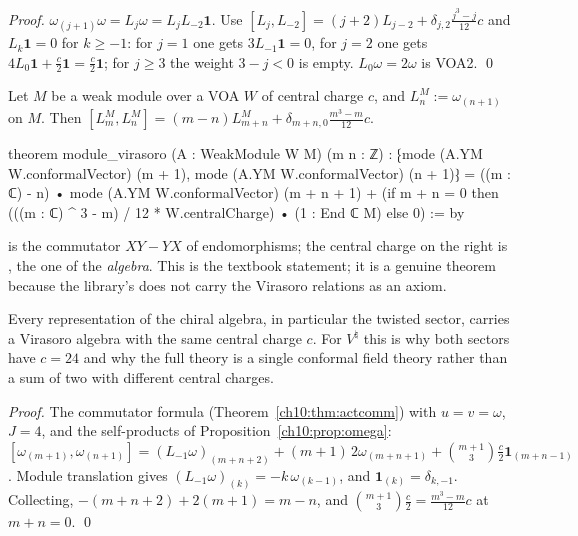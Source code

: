 \emph{Proof.} $\omega_{(j+1)}\omega=L_j\omega=L_jL_{-2}\mathbf1$.  Use $[L_j,L_{-2}]=(j+2)L_{j-2}+
\delta_{j,2}\frac{j^3-j}{12}c$ and $L_k\mathbf1=0$ for $k\ge-1$: for $j=1$ one gets
$3L_{-1}\mathbf1=0$, for $j=2$ one gets $4L_0\mathbf1+\frac c2\mathbf1=\frac c2\mathbf1$; for
$j\ge3$ the weight $3-j<0$ is empty.  $L_0\omega=2\omega$ is VOA2. \qed

\begin{theorem}\label{ch10:thm:modvir}
Let $M$ be a weak module over a VOA $W$ of central charge $c$, and $L^M_n:=\omega_{(n+1)}$ on $M$.
Then $[L^M_m,L^M_n]=(m-n)L^M_{m+n}+\delta_{m+n,0}\frac{m^3-m}{12}c$.
\end{theorem}
\begin{leancode}
theorem module_virasoro (A : WeakModule W M) (m n : ℤ) :
    ⁅mode (A.YM W.conformalVector) (m + 1), mode (A.YM W.conformalVector) (n + 1)⁆
      = ((m : ℂ) - n) • mode (A.YM W.conformalVector) (m + n + 1)
        + (if m + n = 0 then (((m : ℂ) ^ 3 - m) / 12 * W.centralCharge) • (1 : End ℂ M)
           else 0) := by
\end{leancode}
\begin{dictionary}
 is the commutator $XY-YX$ of endomorphisms; the central charge on the right is
, the one of the \emph{algebra}.  This is the textbook statement; it is a
genuine theorem because the library's  does not carry the Virasoro relations as
an axiom.
\end{dictionary}

\begin{physics}
Every representation of the chiral algebra, in particular the twisted sector, carries a Virasoro algebra with the same central charge $c$. For $V^\natural$ this is why both sectors have $c=24$ and why the full theory is a single conformal field theory rather than a sum of two with different central charges.
\end{physics}

\emph{Proof.} The commutator formula (Theorem~\ref{ch10:thm:actcomm}) with $u=v=\omega$, $J=4$,
and the self-products of Proposition~\ref{ch10:prop:omega}:
$[\omega_{(m+1)},\omega_{(n+1)}]=(L_{-1}\omega)_{(m+n+2)}+(m+1)\,2\omega_{(m+n+1)}
+\binom{m+1}3\frac c2\mathbf1_{(m+n-1)}$.  Module translation gives
$(L_{-1}\omega)_{(k)}=-k\,\omega_{(k-1)}$, and $\mathbf1_{(k)}=\delta_{k,-1}$.  Collecting,
$-(m+n+2)+2(m+1)=m-n$, and $\binom{m+1}{3}\frac c2=\frac{m^3-m}{12}c$ at $m+n=0$. \qed


